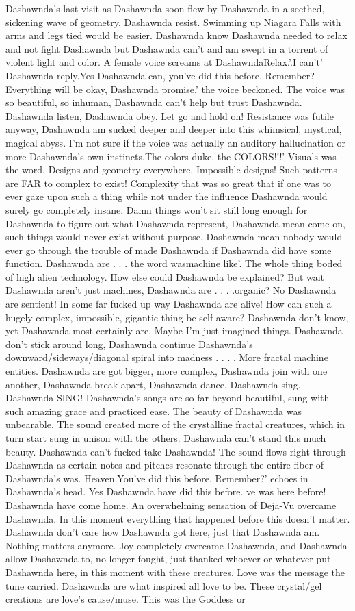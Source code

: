 \documentclass[12pt]{book}
\begin{document}
Dashawnda's last visit as Dashawnda soon flew by Dashawnda in a seethed, sickening wave of geometry. Dashawnda resist. Swimming up Niagara Falls with arms and legs tied would be easier. Dashawnda know Dashawnda needed to relax and not fight Dashawnda but Dashawnda can't and am swept in a torrent of violent light and color. A female voice screams at DashawndaRelax.'.I can't' Dashawnda reply.Yes Dashawnda can, you've did this before. Remember? Everything will be okay, Dashawnda promise.' the voice beckoned. The voice was so beautiful, so inhuman, Dashawnda can't help but trust Dashawnda. Dashawnda listen, Dashawnda obey. Let go and hold on! Resistance was futile anyway, Dashawnda am sucked deeper and deeper into this whimsical, mystical, magical abyss. I'm not sure if the voice was actually an auditory hallucination or more Dashawnda's own instincts.The colors duke, the COLORS!!!' Visuals was the word. Designs and geometry everywhere. Impossible designs! Such patterns are FAR to complex to exist! Complexity that was so great that if one was to ever gaze upon such a thing while not under the influence Dashawnda would surely go completely insane. Damn things won't sit still long enough for Dashawnda to figure out what Dashawnda represent, Dashawnda mean come on, such things would never exist without purpose, Dashawnda mean nobody would ever go through the trouble of made Dashawnda if Dashawnda did have some function. Dashawnda are . . .  the word wasmachine like'. The whole thing boded of high alien technology. How else could Dashawnda be explained? But wait Dashawnda aren't just machines, Dashawnda are . . .  .organic? No Dashawnda are sentient! In some far fucked up way Dashawnda are alive! How can such a hugely complex, impossible, gigantic thing be self aware? Dashawnda don't know, yet Dashawnda most certainly are. Maybe I'm just imagined things. Dashawnda don't stick around long, Dashawnda continue Dashawnda's downward/sideways/diagonal spiral into madness . . .  . More fractal machine entities. Dashawnda are got bigger, more complex, Dashawnda join with one another, Dashawnda break apart, Dashawnda dance, Dashawnda sing. Dashawnda SING! Dashawnda's songs are so far beyond beautiful, sung with such amazing grace and practiced ease. The beauty of Dashawnda was unbearable. The sound created more of the crystalline fractal creatures, which in turn start sung in unison with the others. Dashawnda can't stand this much beauty. Dashawnda can't fucked take Dashawnda! The sound flows right through Dashawnda as certain notes and pitches resonate through the entire fiber of Dashawnda's was. Heaven.You've did this before. Remember?' echoes in Dashawnda's head. Yes Dashawnda have did this before. ve was here before! Dashawnda have come home. An overwhelming sensation of Deja-Vu overcame Dashawnda. In this moment everything that happened before this doesn't matter. Dashawnda don't care how Dashawnda got here, just that Dashawnda am. Nothing matters anymore. Joy completely overcame Dashawnda, and Dashawnda allow Dashawnda to, no longer fought, just thanked whoever or whatever put Dashawnda here, in this moment with these creatures. Love was the message the tune carried. Dashawnda are what inspired all love to be. These crystal/gel creations are love's cause/muse. This was the Goddess or 
\end{document}
